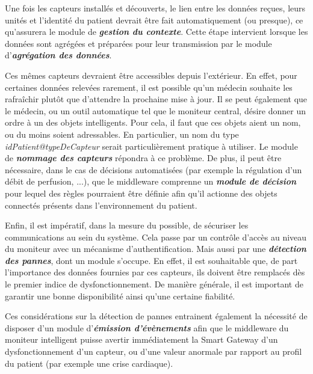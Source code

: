 Une fois les capteurs installés et découverts, le lien entre les données reçues, leurs unités et l'identité du patient devrait être fait automatiquement (ou presque), ce qu'assurera le module de \textbf{\textit{gestion du contexte}}. Cette étape intervient lorsque les données sont agrégées et préparées pour leur transmission par le module d'\textbf{\textit{agrégation des données}}.

Ces mêmes capteurs devraient être accessibles depuis l'extérieur. En effet, pour certaines données relevées rarement, il est possible qu'un médecin souhaite les rafraîchir plutôt que d'attendre la prochaine mise à jour. Il se peut également que le médecin, ou un outil automatique tel que le moniteur central, désire donner un ordre à un des objets intelligents. Pour cela, il faut que ces objets aient un nom, ou du moins soient adressables. En particulier, un nom du type \textit{idPatient@typeDeCapteur} serait particulièrement pratique à utiliser. Le module de \textbf{\textit{nommage des capteurs}} répondra à ce problème. De plus, il peut être nécessaire, dans le cas de décisions automatisées (par exemple la régulation d'un débit de perfusion, ...), que le middleware comprenne un \textbf{\textit{module de décision}} pour lequel des règles pourraient être définie afin qu'il actionne des objets connectés présents dans l'environnement du patient.
\newline

Enfin, il est impératif, dans la mesure du possible, de sécuriser les communications au sein du système. Cela passe par un
contrôle d'accès au niveau du moniteur avec un mécanisme d'authentification. Mais aussi par une \textbf{\textit{détection des pannes}}, dont un module s'occupe. En effet, il
est souhaitable que, de part l'importance des données fournies par ces capteurs, ils doivent être remplacés dès le premier indice
de dysfonctionnement. De manière générale, il est important de garantir une bonne disponibilité ainsi qu'une certaine fiabilité.
\newline

Ces considérations sur la détection de pannes entrainent également la nécessité de disposer d'un module d'\textbf{\textit{émission d'évènements}} afin que le middleware du moniteur intelligent puisse avertir immédiatement la Smart Gateway d'un dysfonctionnement d'un capteur, ou d'une valeur anormale par rapport au profil du patient (par exemple une crise cardiaque).
\newline


